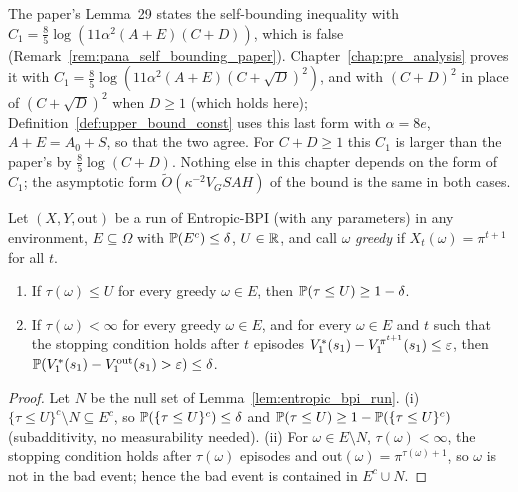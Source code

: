 \begin{remark}\label{rem:pos_c1_constant}
The paper's Lemma~29 states the self-bounding inequality with
$C_1 = \frac85\log(11\alpha^2(A + E)(C + D))$, which is false
(Remark~\ref{rem:pana_self_bounding_paper}). Chapter~\ref{chap:pre_analysis} proves it with
$C_1 = \frac85\log(11\alpha^2(A + E)(C + \sqrt D)^2)$, and with $(C + D)^2$ in place of
$(C + \sqrt D)^2$ when $D \ge 1$ (which holds here); Definition~\ref{def:upper_bound_const}
uses this last form with $\alpha = 8e$, $A + E = A_0 + S$, so that the two agree. For
$C + D \ge 1$ this $C_1$ is larger than the paper's by $\frac85\log(C + D)$. Nothing else in
this chapter depends on the form of $C_1$; the asymptotic form $\tilde O(\kappa^{-2}V_GSAH)$ of
the bound is the same in both cases.
\end{remark}

\begin{lemma}\label{lem:pos_core_pac}
\leanok
{}
Let $(X, Y, \mathrm{out})$ be a run of Entropic-BPI (with any parameters) in any environment, $E \subseteq \Omega$ with
$\mathbb{P}(E^c) \le \delta$, $U \in \mathbb{R}$, and call $\omega$ \emph{greedy} if $X_t(\omega) = \pi^{t+1}$ for all $t$.
\begin{enumerate}
  \item[(i)] If $\tau(\omega) \le U$ for every greedy $\omega \in E$, then $\mathbb{P}(\tau \le U) \ge 1 - \delta$.
  \item[(ii)] If $\tau(\omega) < \infty$ for every greedy $\omega \in E$, and for every $\omega \in E$ and $t$ such that the
  stopping condition holds after $t$ episodes $V^*_1(s_1) - V^{\pi^{t+1}}_1(s_1) \le \varepsilon$, then
  $\mathbb{P}(V^*_1(s_1) - V^{\mathrm{out}}_1(s_1) > \varepsilon) \le \delta$.
\end{enumerate}
\end{lemma}

\begin{proof}
\leanok
Let $N$ be the null set of Lemma~\ref{lem:entropic_bpi_run}. (i) $\{\tau \le U\}^c \setminus N \subseteq E^c$, so
$\mathbb{P}(\{\tau \le U\}^c) \le \delta$ and $\mathbb{P}(\tau \le U) \ge 1 - \mathbb{P}(\{\tau \le U\}^c)$ (subadditivity, no
measurability needed). (ii) For $\omega \in E \setminus N$, $\tau(\omega) < \infty$, the stopping condition holds after
$\tau(\omega)$ episodes and $\mathrm{out}(\omega) = \pi^{\tau(\omega)+1}$, so $\omega$ is not in the bad event; hence the bad
event is contained in $E^c \cup N$.
\end{proof}

